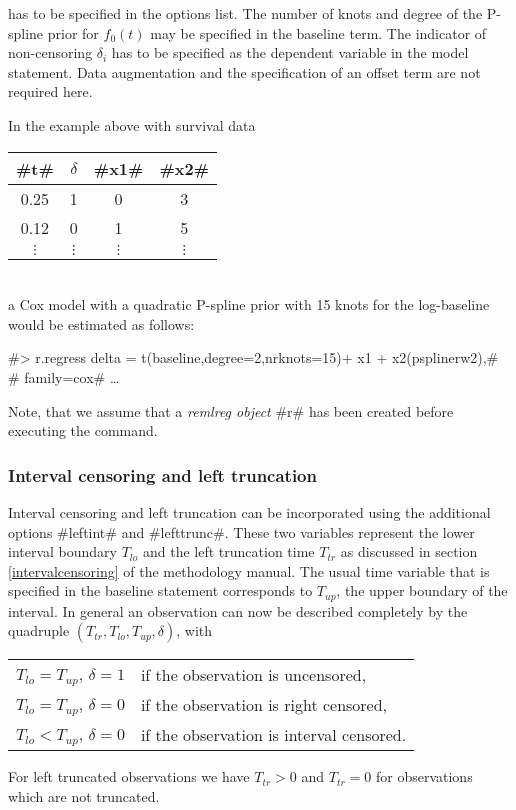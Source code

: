 has to be specified in the options list. The number of knots and
degree of the P-spline prior for $f_0(t)$ may be specified in the
baseline term. The indicator of non-censoring $\delta_i$ has to be
specified as the dependent variable in the model statement. Data
augmentation and the specification of an offset term are not
required here.

In the example above with survival data

\vspace{0.5cm}

\begin{tabular}{c|c|c|c}
  #t# &   $\delta$ &  #x1# &  #x2#\\\hline\hline
0.25  &  1  &    0  &  3\\\hline 0.12  &  0  &    1  &  5\\\hline
$\vdots$ & $\vdots$ & $\vdots$ & $\vdots$ \\
\end{tabular}
\vspace{0.5cm}\\
a Cox model with a quadratic P-spline prior with 15 knots for the
log-baseline would be estimated as follows:

 #> r.regress delta = t(baseline,degree=2,nrknots=15)+ x1 + x2(psplinerw2),#\\
 #  family=cox# \ldots

Note, that we assume that a {\em remlreg object} #r# has been
created before executing the command.

\subsubsection*{Interval censoring and left truncation}
 

Interval censoring and left truncation can be incorporated using the
additional options #leftint# and #lefttrunc#. These two variables
represent the lower interval boundary $T_{lo}$ and the left
truncation time $T_{tr}$ as discussed in section
\ref*{intervalcensoring} of the methodology manual. The usual time
variable that is specified in the baseline statement corresponds to
$T_{up}$, the upper boundary of the interval. In general an
observation can now be described completely by the quadruple
$(T_{tr},T_{lo},T_{up},\delta)$, with
\begin{center}
\begin{tabular}{ll}
$T_{lo}=T_{up}$, $\delta=1$ & if the observation is uncensored,\\
$T_{lo}=T_{up}$, $\delta=0$ & if the observation is right censored,\\
$T_{lo}<T_{up}$, $\delta=0$ & if the observation is interval censored.\\
\end{tabular}
\end{center}
For left truncated observations we have $T_{tr}>0$ and $T_{tr}=0$
for observations which are not truncated.


